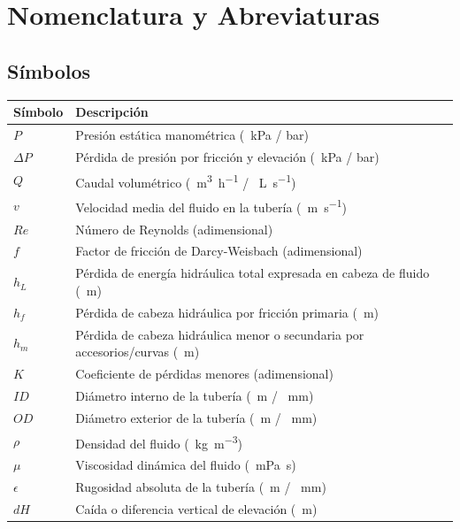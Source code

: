 \section*{Nomenclatura y Abreviaturas}

\subsection*{Símbolos}

\begin{tabularx}{\textwidth}{@{}l>{\raggedright\arraybackslash}X@{}}
	\toprule
	\textbf{Símbolo} & \textbf{Descripción} \\
	\midrule
	$P$ & Presión estática manométrica (\SI{}{\kilo\pascal} / bar) \\
	$\Delta P$ & Pérdida de presión por fricción y elevación (\SI{}{\kilo\pascal} / bar) \\
	$Q$ & Caudal volumétrico (\SI{}{\cubic\meter\per\hour} / \SI{}{\liter\per\second}) \\
	$v$ & Velocidad media del fluido en la tubería (\SI{}{\meter\per\second}) \\
	$Re$ & Número de Reynolds (adimensional) \\
	$f$ & Factor de fricción de Darcy-Weisbach (adimensional) \\
	$h_L$ & Pérdida de energía hidráulica total expresada en cabeza de fluido (\SI{}{\meter}) \\
	$h_f$ & Pérdida de cabeza hidráulica por fricción primaria (\SI{}{\meter}) \\
	$h_m$ & Pérdida de cabeza hidráulica menor o secundaria por accesorios/curvas (\SI{}{\meter}) \\
	$K$ & Coeficiente de pérdidas menores (adimensional) \\
	$ID$ & Diámetro interno de la tubería (\SI{}{\meter} / \SI{}{\mm}) \\
	$OD$ & Diámetro exterior de la tubería (\SI{}{\meter} / \SI{}{\mm}) \\
	$\rho$ & Densidad del fluido (\SI{}{\kilogram\per\cubic\meter}) \\
	$\mu$ & Viscosidad dinámica del fluido (\SI{}{\milli\pascal\second}) \\
	$\epsilon$ & Rugosidad absoluta de la tubería (\SI{}{\meter} / \SI{}{\mm}) \\
	$dH$ & Caída o diferencia vertical de elevación (\SI{}{\meter}) \\
	\bottomrule
\end{tabularx}


